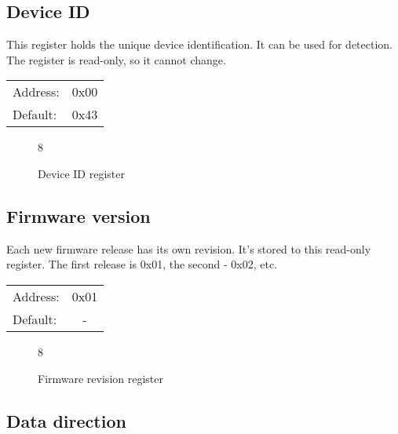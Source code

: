\documentclass{article}
\begin{document}
	\subsection{Device ID}
	
		This register holds the unique device identification. It can be used for detection. The register is read-only, so it cannot change.
		
		\begin{tabular}{ l c }
			Address: & 0x00 \\
			Default: & 0x43 \\
		\end{tabular}
	
		\begin{figure}[H]
			\centering
			\begin{bytefield}[
				bitwidth=0.1\linewidth]{8}
				 \\
			\end{bytefield}
			\caption{Device ID register}
			\label{reg:device_id}
		\end{figure}
	
	\subsection{Firmware version}
	
		Each new firmware release has its own revision. It's stored to this read-only register.
		The first release is 0x01, the second - 0x02, etc.
		
		\begin{tabular}{ l c }
			Address: & 0x01 \\
			Default: & - \\
		\end{tabular}
		
		\begin{figure}[H]
			\centering
			\begin{bytefield}[
				bitwidth=0.1\linewidth]{8}
				\bitheader[endianness=big, bitformatting={\small\bfseries}]{0-7} \\
				\bitbox{8}{FW}
			\end{bytefield}
			\caption{Firmware revision register}
			\label{reg:fw_rev}
		\end{figure}
	
	\subsection{Data direction}
	
\end{document}
